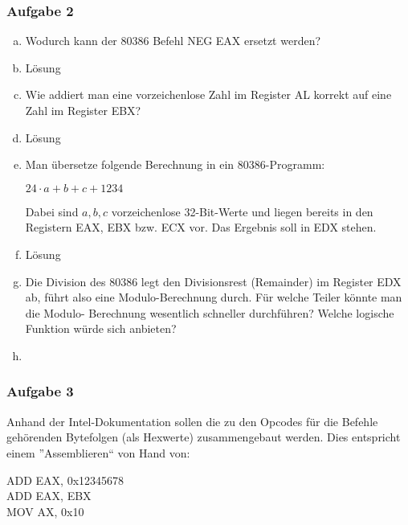 \begin{frame}
    \frametitle{Aufgabe 2}
    \vspace{0.5cm}

    \begin{enumerate}[(a)]
        \item<1-> Wodurch kann der 80386 Befehl NEG EAX ersetzt werden?
        \item<2->[] Lösung
        \item<3-> Wie addiert man eine vorzeichenlose Zahl im Register AL korrekt auf eine Zahl im Register EBX?
        \item<4->[] Lösung
        \item<5-> Man übersetze folgende Berechnung in ein 80386-Programm: \\
           \begin{center}
                \( 24 \cdot a + b + c + 1234 \)
            \end{center}
            Dabei sind \( a,b,c \) vorzeichenlose 32-Bit-Werte und liegen bereits in den 
            Registern EAX, EBX bzw. ECX vor. Das Ergebnis soll in EDX stehen.
        \item<6->[] Lösung
        \item<5-> Die Division des 80386 legt den Divisionsrest (Remainder)
            im Register EDX ab, führt also eine Modulo-Berechnung durch.
            Für welche Teiler könnte man die Modulo- Berechnung wesentlich schneller durchführen? 
            Welche logische Funktion würde sich anbieten?
        \item
    \end{enumerate}
\end{frame}

\begin{frame}[fragile]
    \frametitle{Aufgabe 3}
    \vspace{0.5cm}

    Anhand der Intel-Dokumentation sollen die zu den Opcodes für die Befehle 
    gehörenden Bytefolgen (als Hexwerte) zusammengebaut werden. 
    Dies entspricht einem ”Assemblieren“ von Hand von:

    ADD EAX, 0x12345678 \\
    ADD EAX, EBX \\
    MOV AX, 0x10 \\

\end{frame}

